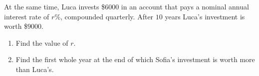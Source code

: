 \documentclass[12pt, twoside]{article}
\begin{document}
\begin{enumerate}[itemsep=0.15cm]
At the same time, Luca invests \$$6000$ in an account that pays a
nominal annual interest rate of $r\%$, compounded quarterly. After
$10$ years Luca's investment is worth \$$9000$.

\begin{enumerate}[resume, itemsep=0.1cm]
  \item Find the value of $r$.
  \vfill
  \item Find the first whole year at the end of which Sofia's
  investment is worth more than Luca's.
\end{enumerate}

\vfill

\end{enumerate}
\end{document}
